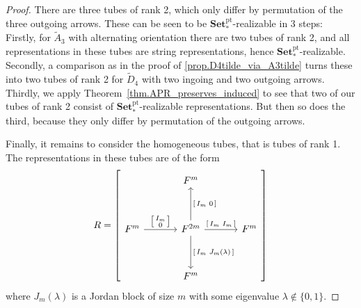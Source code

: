 \documentclass[a4paper]{amsart}
\theoremstyle{plain}
\theoremstyle{definition}
\theoremstyle{remark}
\newcommand{\pSet}{\mathbf{Set}^\mathrm{pt}}
\begin{document}
\begin{proof}
There are three tubes of rank 2, which only differ by permutation of the three outgoing arrows. These can be seen to be \( \pSet_* \)-realizable in 3 steps:
Firstly, for \( \widetilde{A}_3 \) with alternating orientation there are two tubes of rank 2, and all representations in these tubes are string representations, hence \( \pSet_* \)-realizable.
Secondly, a comparison as in the proof of \ref{prop.D4tilde_via_A3tilde} turns these into two tubes of rank 2 for \( \widetilde{D}_4 \) with two ingoing and two outgoing arrows.
Thirdly, we apply Theorem~\ref{thm.APR_preserves_induced} to see that two of our tubes of rank 2 consist of \( \pSet_* \)-realizable representations. But then so does the third, because they only differ by permutation of the outgoing arrows.

Finally, it remains to consider the homogeneous tubes, that is tubes of rank 1. The representations in these tubes are of the form
\[ R = \left[ \begin{tikzcd}[sep=12mm, ampersand replacement = \&]
  \& F^m\&  \\
  F^m \ar[r, "{\left[ \begin{smallmatrix} I_m \\ 0 \end{smallmatrix} \right]}"] \& F^{2m} \ar[u,swap, "{\left[ \begin{smallmatrix} I_m & 0 \end{smallmatrix} \right]}"] \ar[r, "{\left[ \begin{smallmatrix} I_m & I_m \end{smallmatrix} \right]}"] \ar[d, "{\left[ \begin{smallmatrix} I_m & J_m(\lambda) \end{smallmatrix} \right]}"] \& F^m \\
  \& F^m \& \end{tikzcd} \right] \]
where \( J_m(\lambda) \) is a Jordan block of size \( m \) with some eigenvalue \( \lambda \not\in \{ 0,1 \} \).


\end{proof}
\end{document}
